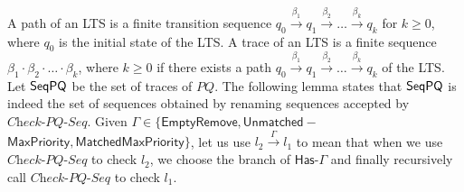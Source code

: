 A path of an LTS is a finite transition sequence $q_0\xrightarrow{\beta_1}q_1\overset{\beta_2}{\longrightarrow}\ldots\overset{\beta_k}{\longrightarrow}q_k$ for $k\geq 0$, where $q_0$ is the initial state of the LTS. A trace of an LTS is a finite sequence $\beta_1 \cdot \beta_2 \cdot \ldots \cdot \beta_k$, where $k \geq 0$ if there exists a path $q_0\overset{\beta_1}{\longrightarrow}q_1\overset{\beta_2}{\longrightarrow}\ldots\overset{\beta_k}{\longrightarrow}q_k$ of the LTS. Let $\mathsf{SeqPQ}$ be the set of traces of $\textit{PQ}$. The following lemma states that $\mathsf{SeqPQ}$ is indeed the set of sequences obtained by renaming sequences accepted by $\textit{Check-PQ-Seq}$. Given $\Gamma\in \{\mathsf{EmptyRemove}, \mathsf{Unmatched-}$ $\mathsf{MaxPriority}, \mathsf{MatchedMaxPriority}\}$, let us use $l_2 \xrightarrow{\Gamma} l_1$ to mean that when we use $\textit{Check-PQ-Seq}$ to check $l_2$, we choose the branch of $\mathsf{Has\text{-}\Gamma}$ and finally recursively call $\textit{Check-PQ-Seq}$ to check $l_1$.

\EPQRulesAndSemantics*

